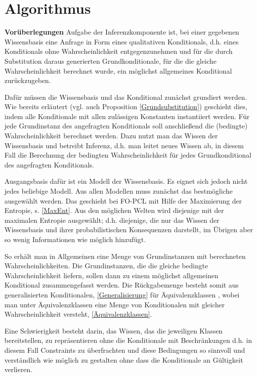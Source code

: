 \documentclass[a4paper, 11pt]{book}
\begin{document}
\chapter{Algorithmus} \label{Alg}

\textbf{Vorüberlegungen}
Aufgabe der Inferenzkomponente ist, bei einer gegebenen Wissensbasis eine Anfrage in Form eines qualitativen Konditionals, d.h. eines Konditionals ohne Wahrscheinlichkeit entgegenzunehmen und für die durch Substitution daraus generierten Grundkonditionale, für die die gleiche Wahrscheinlichkeit berechnet wurde, ein möglichst allgemeines Konditional zurückzugeben.

Dafür müssen die Wissensbasis und das Konditional zunächst grundiert werden. Wie bereits erläutert (vgl. auch Proposition \ref{Grundsubstitution}) geschieht dies, indem alle Konditionale mit allen zulässigen Konstanten instantiiert werden.
Für jede Grundinstanz des angefragten Konditionals soll anschließend die (bedingte) Wahrscheinlichkeit berechnet werden.
Dazu nutzt man das Wissen der Wissensbasis und betreibt Inferenz, d.h. man leitet neues Wissen ab,  in diesem Fall die Berechnung der bedingten Wahrscheinlichkeit für jedes Grundkonditional des angefragten Konditionals.

Ausgangsbasis dafür ist ein Modell der Wissensbasis. Es eignet sich jedoch nicht jedes beliebige Modell. Aus allen Modellen muss zunächst das bestmögliche ausgewählt werden.
Das geschieht bei FO-PCL mit Hilfe der Maximierung der Entropie, s. \ref{MaxEnt}. Aus den möglichen Welten wird diejenige mit der maximalen Entropie ausgewählt; d.h. diejenige, die nur das Wissen der Wissensbasis und ihrer probabilistischen Konsequenzen darstellt, im Übrigen aber so wenig Informationen wie möglich hinzufügt.

So erhält man in Allgemeinen eine Menge von Grundinstanzen mit berechneten Wahrscheinlichkeiten.
Die Grundinstanzen, die die gleiche bedingte Wahrscheinlichkeit liefern, sollen dann zu einem möglichst allgemeinen Konditional zusammengefasst werden. Die Rückgabemenge besteht somit aus generalisierten Konditionalen, \ref{Generalisierung} für Äquivalenzklassen  , wobei man unter Äquivalenzklassen eine Menge von Konditionalen mit gleicher Wahrscheinlichkeit versteht, \ref{Äquivalenzklassen}. 

Eine Schwierigkeit besteht darin, das Wissen, das die jeweiligen Klassen bereitstellen, zu repräsentieren ohne die Konditionale mit Beschränkungen d.h. in diesem Fall Constraints zu überfrachten und diese Bedingungen so sinnvoll und verständlich wie möglich zu gestalten ohne dass die Konditionale an Gültigkeit verlieren.
\end{document}
